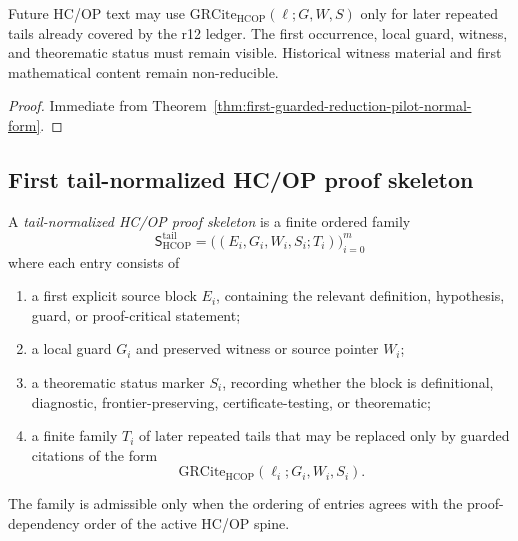 \begin{corollary}
\label{cor:v3340-r13-working-rule}
Future HC/OP text may use \(\mathrm{GRCite}_{\mathrm{HCOP}}(\ell;G,W,S)\) only for later repeated tails already covered by the r12 ledger. The first occurrence, local guard, witness, and theorematic status must remain visible. Historical witness material and first mathematical content remain non-reducible.
\end{corollary}

\begin{proof}
Immediate from Theorem~\ref{thm:first-guarded-reduction-pilot-normal-form}.
\end{proof}

\subsection{First tail-normalized HC/OP proof skeleton}
\label{subsec:first-tail-normalized-hcop-proof-skeleton}

\begin{definition}
\label{def:tail-normalized-hcop-proof-skeleton}
A \emph{tail-normalized HC/OP proof skeleton} is a finite ordered family
\[
  \mathsf S_{\mathrm{HCOP}}^{\mathrm{tail}}
  =
  \bigl((E_i,G_i,W_i,S_i;T_i)\bigr)_{i=0}^{m}
\]
where each entry consists of
\begin{enumerate}[leftmargin=2em,label=(\roman*)]
  \item a first explicit source block \(E_i\), containing the relevant definition, hypothesis, guard, or proof-critical statement;
  \item a local guard \(G_i\) and preserved witness or source pointer \(W_i\);
  \item a theorematic status marker \(S_i\), recording whether the block is definitional, diagnostic, frontier-preserving, certificate-testing, or theorematic;
  \item a finite family \(T_i\) of later repeated tails that may be replaced only by guarded citations of the form
  \[
    \mathrm{GRCite}_{\mathrm{HCOP}}(\ell_i;G_i,W_i,S_i).
  \]
\end{enumerate}
The family is admissible only when the ordering of entries agrees with the proof-dependency order of the active HC/OP spine.
\end{definition}

